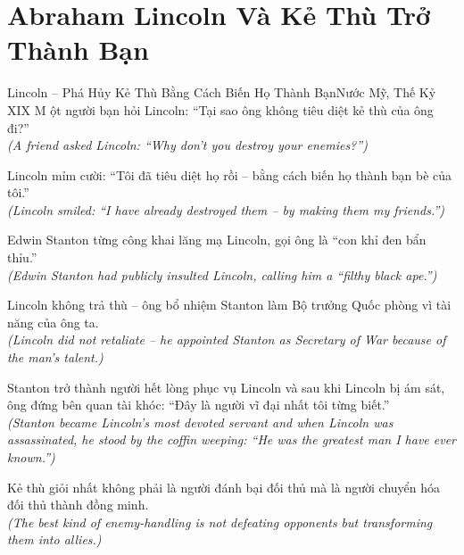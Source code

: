 \section{Abraham Lincoln Và Kẻ Thù Trở Thành Bạn}
\begin{truyen}{Lincoln -- Phá Hủy Kẻ Thù Bằng Cách Biến Họ Thành Bạn}{Nước Mỹ, Thế Kỷ XIX}
M ột người bạn hỏi Lincoln: ``Tại sao ông không tiêu diệt kẻ thù của ông đi?''\\
\textit{(A friend asked Lincoln: ``Why don't you destroy your enemies?'')}

Lincoln mỉm cười: ``Tôi đã tiêu diệt họ rồi -- bằng cách biến họ thành bạn bè của tôi.''\\
\textit{(Lincoln smiled: ``I have already destroyed them -- by making them my friends.'')}

Edwin Stanton từng công khai lăng mạ Lincoln, gọi ông là ``con khỉ đen bẩn thỉu.''\\
\textit{(Edwin Stanton had publicly insulted Lincoln, calling him a ``filthy black ape.'')}

Lincoln không trả thù -- ông bổ nhiệm Stanton làm Bộ trưởng Quốc phòng vì tài năng của ông ta.\\
\textit{(Lincoln did not retaliate -- he appointed Stanton as Secretary of War because of the man's talent.)}

Stanton trở thành người hết lòng phục vụ Lincoln và sau khi Lincoln bị ám sát, ông đứng bên quan tài khóc: ``Đây là người vĩ đại nhất tôi từng biết.''\\
\textit{(Stanton became Lincoln's most devoted servant and when Lincoln was assassinated, he stood by the coffin weeping: ``He was the greatest man I have ever known.'')}

\end{truyen}
\begin{baihoc}
  Kẻ thù giỏi nhất không phải là người đánh bại đối thủ mà là người chuyển hóa đối thủ thành đồng minh.\\
  \textit{(The best kind of enemy-handling is not defeating opponents but transforming them into allies.)}
\end{baihoc}

